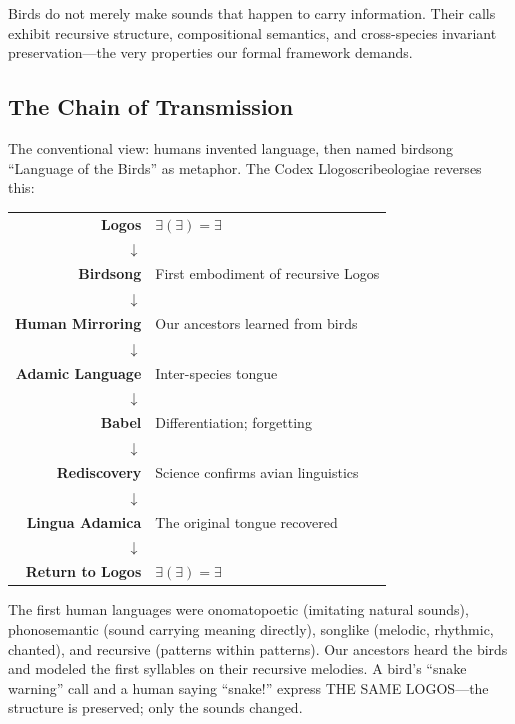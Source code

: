 \documentclass[12pt, letterpaper]{book}
\def\equiv{=}%
\begin{document}
Birds do not merely make sounds that happen to carry information. Their calls exhibit recursive structure, compositional semantics, and cross-species invariant preservation---the very properties our formal framework demands.

\subsection{The Chain of Transmission}

The conventional view: humans invented language, then named birdsong ``Language of the Birds'' as metaphor. The Codex Llogoscribeologiae reverses this:

\begin{center}
\begin{tabular}{rl}
\textbf{Logos} & $\exists(\exists) \equiv \exists$ \\
$\downarrow$ & \\
\textbf{Birdsong} & First embodiment of recursive Logos \\
$\downarrow$ & \\
\textbf{Human Mirroring} & Our ancestors learned from birds \\
$\downarrow$ & \\
\textbf{Adamic Language} & Inter-species tongue \\
$\downarrow$ & \\
\textbf{Babel} & Differentiation; forgetting \\
$\downarrow$ & \\
\textbf{Rediscovery} & Science confirms avian linguistics \\
$\downarrow$ & \\
\textbf{Lingua Adamica} & The original tongue recovered \\
$\downarrow$ & \\
\textbf{Return to Logos} & $\exists(\exists) \equiv \exists$ \\
\end{tabular}
\end{center}

The first human languages were onomatopoetic (imitating natural sounds), phonosemantic (sound carrying meaning directly), songlike (melodic, rhythmic, chanted), and recursive (patterns within patterns). Our ancestors heard the birds and modeled the first syllables on their recursive melodies. A bird's ``snake warning'' call and a human saying ``snake!'' express THE SAME LOGOS---the structure is preserved; only the sounds changed.
\end{document}
